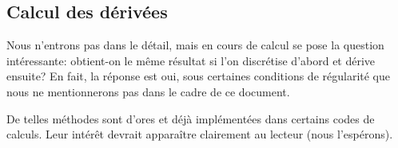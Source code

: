 \medskip
\subsection{Calcul des dérivées}

Nous n'entrons pas dans le détail, mais en cours de calcul se pose la question intéressante: obtient-on le même résultat si l'on discrétise d'abord et dérive ensuite? En fait, la réponse est oui, sous certaines conditions de régularité que nous ne mentionnerons pas dans le cadre de ce document.

\medskip
{}

De telles méthodes sont d'ores et déjà implémentées dans certains codes de calculs. Leur intérêt devrait apparaître clairement au lecteur (nous l'espérons).
